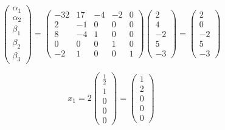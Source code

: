 \documentclass[12pt, a4paper]{article}
\begin{document}
    \begin{equation}
        \begin{pmatrix}
            \alpha_1 \\ \alpha_2 \\ \beta_1 \\ \beta_2 \\ \beta_3
        \end{pmatrix} = \left(\begin{matrix}
            -32 & 17 & -4 & -2 & 0 \\
            2 & -1 & 0 & 0 & 0 \\
            8 & -4 & 1 & 0 & 0 \\
            0 & 0 & 0 & 1 & 0 \\
            -2 & 1 & 0 & 0 & 1
        \end{matrix}\right) \begin{pmatrix}
            2 \\ 4 \\ -2 \\ 5 \\ -3
        \end{pmatrix} = \left(\begin{matrix}
            2 \\
            0 \\
            -2 \\
            5 \\
            -3
        \end{matrix}\right)
    \end{equation}
    
    \begin{equation}
        x_1 = 2 \left(\begin{matrix}
            \frac{1}{2} \\
            1 \\
            0 \\
            0 \\
            0
        \end{matrix}\right) = \left(\begin{matrix}
            1 \\
            2 \\
            0 \\
            0 \\
            0
        \end{matrix}\right)
    \end{equation}
\end{document}
